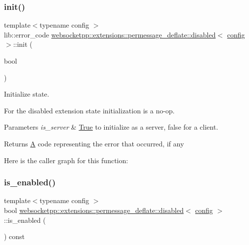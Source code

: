 \subsubsection{\texorpdfstring{init()}{init()}}
{\footnotesize\ttfamily template$<$typename config $>$ \\
lib\+::error\+\_\+code \mbox{\hyperlink{classwebsocketpp_1_1extensions_1_1permessage__deflate_1_1disabled}{websocketpp\+::extensions\+::permessage\+\_\+deflate\+::disabled}}$<$ \mbox{\hyperlink{classconfig}{config}} $>$\+::init (\begin{DoxyParamCaption}\item[{bool}]{ }\end{DoxyParamCaption})\hspace{0.3cm}{\ttfamily [inline]}}



Initialize state. 

For the disabled extension state initialization is a no-\/op.


\begin{DoxyParams}{Parameters}
{\em is\+\_\+server} & \mbox{\hyperlink{struct_true}{True}} to initialize as a server, false for a client. \\
\hline
\end{DoxyParams}
\begin{DoxyReturn}{Returns}
\mbox{\hyperlink{struct_a}{A}} code representing the error that occurred, if any 
\end{DoxyReturn}
Here is the caller graph for this function\+:
\mbox{\label{classwebsocketpp_1_1extensions_1_1permessage__deflate_1_1disabled_a821b1f5929e8330e24e792e0d3ac98a9}} 
\subsubsection{\texorpdfstring{is\+\_\+enabled()}{is\_enabled()}}
{\footnotesize\ttfamily template$<$typename config $>$ \\
bool \mbox{\hyperlink{classwebsocketpp_1_1extensions_1_1permessage__deflate_1_1disabled}{websocketpp\+::extensions\+::permessage\+\_\+deflate\+::disabled}}$<$ \mbox{\hyperlink{classconfig}{config}} $>$\+::is\+\_\+enabled (\begin{DoxyParamCaption}{ }\end{DoxyParamCaption}) const\hspace{0.3cm}{\ttfamily [inline]}}

